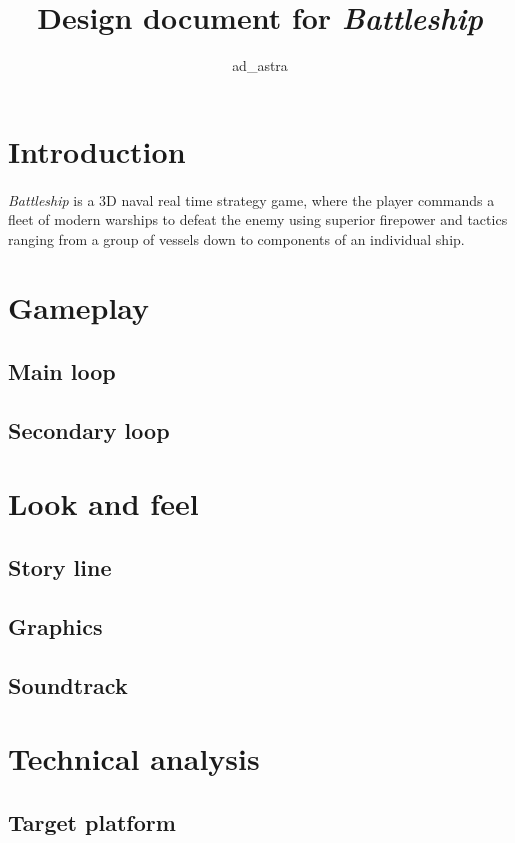 \documentclass{article}[10pt]
\begin{document}
\title{Design document for \emph{Battleship}}
\author{ad\_astra}
\maketitle

\pagebreak
\tableofcontents
\pagebreak

\section{Introduction}
\paragraph{}
\emph{Battleship} is a 3D naval real time strategy game, where the player commands a fleet of modern warships to defeat the enemy using superior firepower and tactics ranging from a group of vessels down to components of an individual ship.
\pagebreak

\section{Gameplay}
\subsection{Main loop}
\subsection{Secondary loop}
\pagebreak

\section{Look and feel}
\subsection{Story line}
\subsection{Graphics}
\subsection{Soundtrack}
\pagebreak

\section{Technical analysis}
\subsection{Target platform}
\end{document}
